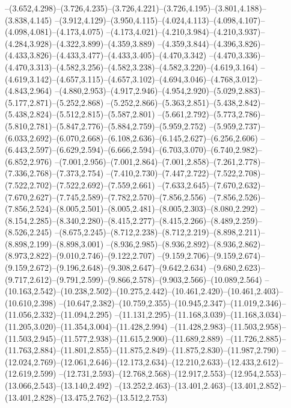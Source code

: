  --(3.652,4.298)--(3.726,4.235)--(3.726,4.221)--(3.726,4.195)--(3.801,4.188)--(3.838,4.145)%
  --(3.912,4.129)--(3.950,4.115)--(4.024,4.113)--(4.098,4.107)--(4.098,4.081)--(4.173,4.075)%
  --(4.173,4.021)--(4.210,3.984)--(4.210,3.937)--(4.284,3.928)--(4.322,3.899)--(4.359,3.889)%
  --(4.359,3.844)--(4.396,3.826)--(4.433,3.826)--(4.433,3.477)--(4.433,3.405)--(4.470,3.342)%
  --(4.470,3.336)--(4.470,3.313)--(4.582,3.256)--(4.582,3.238)--(4.582,3.220)--(4.619,3.164)%
  --(4.619,3.142)--(4.657,3.115)--(4.657,3.102)--(4.694,3.046)--(4.768,3.012)--(4.843,2.964)%
  --(4.880,2.953)--(4.917,2.946)--(4.954,2.920)--(5.029,2.883)--(5.177,2.871)--(5.252,2.868)%
  --(5.252,2.866)--(5.363,2.851)--(5.438,2.842)--(5.438,2.824)--(5.512,2.815)--(5.587,2.801)%
  --(5.661,2.792)--(5.773,2.786)--(5.810,2.781)--(5.847,2.776)--(5.884,2.759)--(5.959,2.752)%
  --(5.959,2.737)--(6.033,2.692)--(6.070,2.668)--(6.108,2.636)--(6.145,2.627)--(6.256,2.606)%
  --(6.443,2.597)--(6.629,2.594)--(6.666,2.594)--(6.703,3.070)--(6.740,2.982)--(6.852,2.976)%
  --(7.001,2.956)--(7.001,2.864)--(7.001,2.858)--(7.261,2.778)--(7.336,2.768)--(7.373,2.754)%
  --(7.410,2.730)--(7.447,2.722)--(7.522,2.708)--(7.522,2.702)--(7.522,2.692)--(7.559,2.661)%
  --(7.633,2.645)--(7.670,2.632)--(7.670,2.627)--(7.745,2.589)--(7.782,2.570)--(7.856,2.556)%
  --(7.856,2.526)--(7.856,2.524)--(8.005,2.501)--(8.005,2.481)--(8.005,2.303)--(8.080,2.292)%
  --(8.154,2.285)--(8.340,2.280)--(8.415,2.277)--(8.415,2.266)--(8.489,2.259)--(8.526,2.245)%
  --(8.675,2.245)--(8.712,2.238)--(8.712,2.219)--(8.898,2.211)--(8.898,2.199)--(8.898,3.001)%
  --(8.936,2.985)--(8.936,2.892)--(8.936,2.862)--(8.973,2.822)--(9.010,2.746)--(9.122,2.707)%
  --(9.159,2.706)--(9.159,2.674)--(9.159,2.672)--(9.196,2.648)--(9.308,2.647)--(9.642,2.634)%
  --(9.680,2.623)--(9.717,2.612)--(9.791,2.599)--(9.866,2.578)--(9.903,2.566)--(10.089,2.564)%
  --(10.163,2.542)--(10.238,2.502)--(10.275,2.442)--(10.461,2.420)--(10.461,2.403)--(10.610,2.398)%
  --(10.647,2.382)--(10.759,2.355)--(10.945,2.347)--(11.019,2.346)--(11.056,2.332)--(11.094,2.295)%
  --(11.131,2.295)--(11.168,3.039)--(11.168,3.034)--(11.205,3.020)--(11.354,3.004)--(11.428,2.994)%
  --(11.428,2.983)--(11.503,2.958)--(11.503,2.945)--(11.577,2.938)--(11.615,2.900)--(11.689,2.889)%
  --(11.726,2.885)--(11.763,2.884)--(11.801,2.855)--(11.875,2.849)--(11.875,2.830)--(11.987,2.790)%
  --(12.024,2.769)--(12.061,2.646)--(12.173,2.634)--(12.210,2.633)--(12.433,2.612)--(12.619,2.599)%
  --(12.731,2.593)--(12.768,2.568)--(12.917,2.553)--(12.954,2.553)--(13.066,2.543)--(13.140,2.492)%
  --(13.252,2.463)--(13.401,2.463)--(13.401,2.852)--(13.401,2.828)--(13.475,2.762)--(13.512,2.753)%
